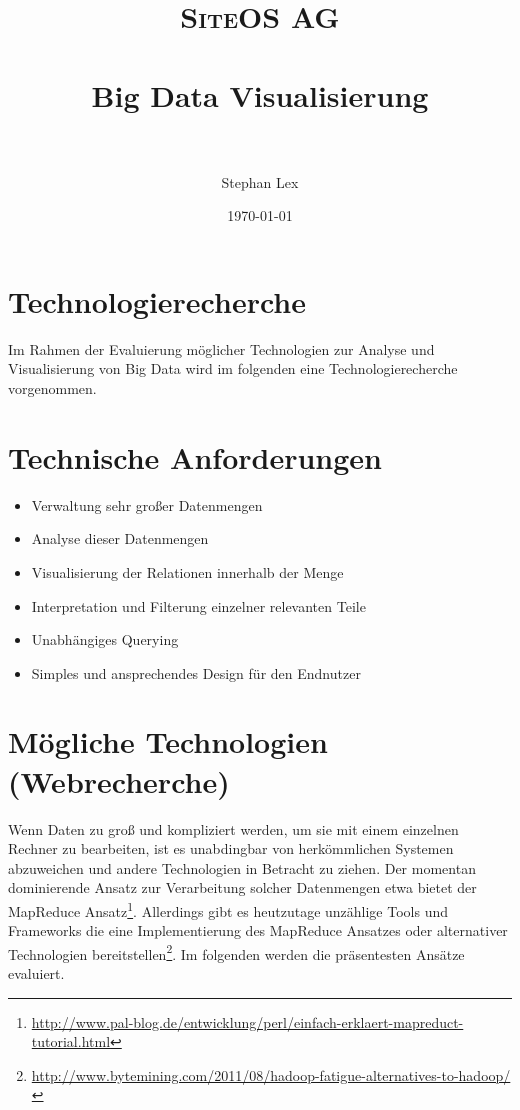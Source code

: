 \documentclass[paper=a4, fontsize=11pt]{scrartcl}
\title{	
\normalfont \normalsize 
\textsc{SiteOS AG} \\ [10pt] %
\horrule{0.5pt} \\[0.4cm] %
\huge Big Data Visualisierung \\ %
\horrule{2pt} \\[0.5cm] %
}
\author{Stephan Lex} %
\date{\normalsize\today} %
\begin{document}
\maketitle %



\section*{Technologierecherche}
Im Rahmen der Evaluierung m\"oglicher Technologien zur Analyse und Visualisierung von Big Data wird im folgenden eine Technologierecherche vorgenommen.
\section{Technische Anforderungen}
\begin{itemize}
\item Verwaltung sehr gro\ss{}er Datenmengen
\item Analyse dieser Datenmengen
\item Visualisierung der Relationen innerhalb der Menge 
\item Interpretation und Filterung einzelner relevanten Teile
\item Unabh\"angiges Querying
\item Simples und ansprechendes Design f\"ur den Endnutzer
\end{itemize}

\section{M\"ogliche Technologien (Webrecherche)}
Wenn Daten zu gro\ss{} und kompliziert werden, um sie mit einem einzelnen Rechner zu bearbeiten, ist es unabdingbar von herk\"ommlichen Systemen abzuweichen und andere Technologien in Betracht zu ziehen. Der momentan dominierende Ansatz zur Verarbeitung solcher Datenmengen etwa bietet der MapReduce Ansatz\footnote{\url{http://www.pal-blog.de/entwicklung/perl/einfach-erklaert-mapreduct-tutorial.html}}.
Allerdings gibt es heutzutage unz\"ahlige Tools und Frameworks die eine Implementierung des MapReduce Ansatzes oder alternativer Technologien bereitstellen\footnote{\url{http://www.bytemining.com/2011/08/hadoop-fatigue-alternatives-to-hadoop/}}.
Im folgenden werden die pr\"asentesten Ans\"atze evaluiert.\\
\end{document}
